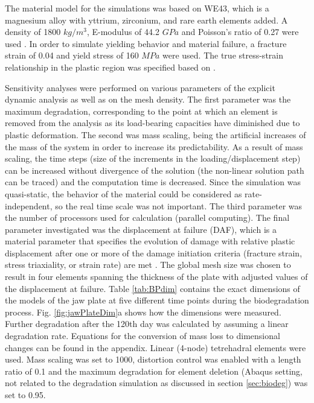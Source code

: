 The material model for the simulations was based on WE43, which is a magnesium alloy with yttrium, zirconium, and rare earth elements added. A density of 1800 $kg/m^3$, E-modulus of 44.2 $GPa$ and Poisson's ratio of 0.27 were used \cite{Agarwal2016}. In order to simulate yielding behavior and material failure, a fracture strain of 0.04 and yield stress of 160 $MPa$ were used. The true stress-strain relationship in the plastic region was specified based on \cite{WE43}.


Sensitivity analyses were performed on various parameters of the explicit dynamic analysis as well as on the mesh density. The first parameter was the maximum degradation, corresponding to the point at which an element is removed from the analysis as its load-bearing capacities have diminished due to plastic deformation. The second was mass scaling, being the artificial increases of the mass of the system in order to increase its predictability. As a result of mass scaling, the time steps (size of the increments in the loading/displacement step) can be increased without divergence of the solution (the non-linear solution path can be traced) and the computation time is decreased. Since the simulation was quasi-static, the behavior of the material could be considered as rate-independent, so the real time scale was not important. The third parameter was the number of processors used for calculation (parallel computing). The final parameter investigated was the displacement at failure (\gls{DAF}), which is a material parameter that specifies the evolution of damage with relative plastic displacement after one or more of the damage initiation criteria (fracture strain, stress triaxiality, or strain rate) are met \cite{daf,daf2}. The global mesh size was chosen to result in four elements spanning the thickness of the plate with adjusted values of the displacement at failure. Table \ref{tab:BPdim} contains the exact dimensions of the models of the jaw plate at five different time points during the biodegradation process. Fig. \ref{fig:jawPlateDim}a shows how the dimensions were measured. Further degradation after the 120th day was calculated by assuming a linear degradation rate. Equations for the conversion of mass loss to dimensional changes can be found in the appendix. Linear (4-node) tetrehadral elements were used. Mass scaling was set to 1000, distortion control was enabled with a length ratio of 0.1 and the maximum degradation for element deletion (Abaqus setting, not related to the degradation simulation as discussed in section \ref{sec:biodeg}) was set to 0.95.

